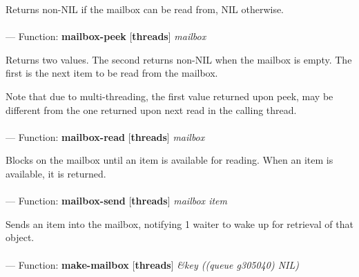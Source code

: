 \begin{adjustwidth}{5em}{5em}
Returns non-NIL if the mailbox can be read from, NIL otherwise.
\end{adjustwidth}

\paragraph{}
\label{THREADS:MAILBOX-PEEK}
--- Function: \textbf{mailbox-peek} [\textbf{threads}] \textit{mailbox}

\begin{adjustwidth}{5em}{5em}
Returns two values. The second returns non-NIL when the mailbox
is empty. The first is the next item to be read from the mailbox.

Note that due to multi-threading, the first value returned upon
peek, may be different from the one returned upon next read in the
calling thread.
\end{adjustwidth}

\paragraph{}
\label{THREADS:MAILBOX-READ}
--- Function: \textbf{mailbox-read} [\textbf{threads}] \textit{mailbox}

\begin{adjustwidth}{5em}{5em}
Blocks on the mailbox until an item is available for reading.
When an item is available, it is returned.
\end{adjustwidth}

\paragraph{}
\label{THREADS:MAILBOX-SEND}
--- Function: \textbf{mailbox-send} [\textbf{threads}] \textit{mailbox item}

\begin{adjustwidth}{5em}{5em}
Sends an item into the mailbox, notifying 1 waiter
to wake up for retrieval of that object.
\end{adjustwidth}

\paragraph{}
\label{THREADS:MAKE-MAILBOX}
--- Function: \textbf{make-mailbox} [\textbf{threads}] \textit{\&key ((queue g305040) NIL)}

